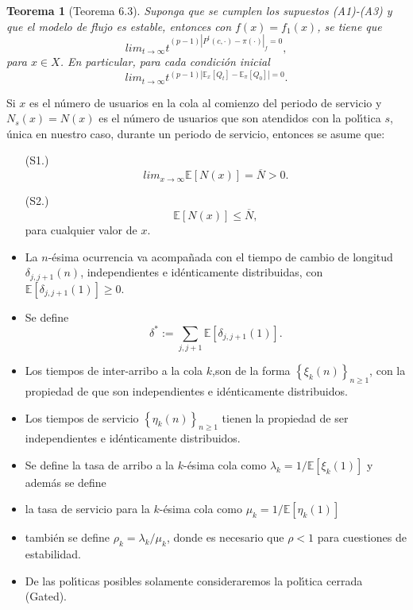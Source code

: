 \documentclass{article}
\newtheorem{Teo}{Teorema}
\newcommand{\esp}{\mathbb{E}}
\begin{document}
\begin{Teo}[Teorema 6.3\cite{DaiSean}]\label{Tma.6.3}
Suponga que se cumplen los supuestos (A1)-(A3) y que el modelo de flujo es estable, entonces con $f\left(x\right)=f_{1}\left(x\right)$, se tiene que \[lim_{t\rightarrow\infty}t^{(p-1)\left|P^{t}\left(c,\cdot\right)-\pi\left(\cdot\right)\right|_{f}=0},\] para $x\in X$. En particular, para cada condici\'on inicial \[lim_{t\rightarrow\infty}t^{(p-1)\left|\esp_{x}\left[Q_{t}\right]-\esp_{\pi}\left[Q_{0}\right]\right|=0}.\]
\end{Teo}


Si $x$ es el n{\'u}mero de usuarios en la cola al comienzo del periodo de servicio y $N_{s}\left(x\right)=N\left(x\right)$ es el n{\'u}mero de usuarios que son atendidos con la pol{\'\i}tica $s$, {\'u}nica en nuestro caso, durante un periodo de servicio, entonces se asume que:
\begin{itemize}
\item[(S1.)]
\begin{equation}\label{S1}
lim_{x\rightarrow\infty}\esp\left[N\left(x\right)\right]=\overline{N}>0.
\end{equation}
\item[(S2.)]
\begin{equation}\label{S2}
\esp\left[N\left(x\right)\right]\leq \overline{N}, \end{equation}
para cualquier valor de $x$. \item La $n$-{\'e}sima ocurrencia va acompa{\~n}ada con el tiempo de cambio de longitud $\delta_{j,j+1}\left(n\right)$, independientes e id{\'e}nticamente distribuidas, con $\esp\left[\delta_{j,j+1}\left(1\right)\right]\geq0$. \item Se
define
\begin{equation}
\delta^{*}:=\sum_{j,j+1}\esp\left[\delta_{j,j+1}\left(1\right)\right].
\end{equation}

\item Los tiempos de inter-arribo a la cola $k$,son de la forma
$\left\{\xi_{k}\left(n\right)\right\}_{n\geq1}$, con la propiedad de que son independientes e id{\'e}nticamente distribuidos.

\item Los tiempos de servicio
$\left\{\eta_{k}\left(n\right)\right\}_{n\geq1}$ tienen la propiedad de ser independientes e id{\'e}nticamente distribuidos.

\item Se define la tasa de arribo a la $k$-{\'e}sima cola como $\lambda_{k}=1/\esp\left[\xi_{k}\left(1\right)\right]$ y adem{\'a}s se define

\item la tasa de servicio para la $k$-{\'e}sima cola como
$\mu_{k}=1/\esp\left[\eta_{k}\left(1\right)\right]$

\item tambi{\'e}n se define $\rho_{k}=\lambda_{k}/\mu_{k}$, donde es necesario que $\rho<1$ para cuestiones de estabilidad.

\item De las pol{\'\i}ticas posibles solamente consideraremos la pol{\'\i}tica cerrada (Gated).
\end{itemize}
\end{document}
